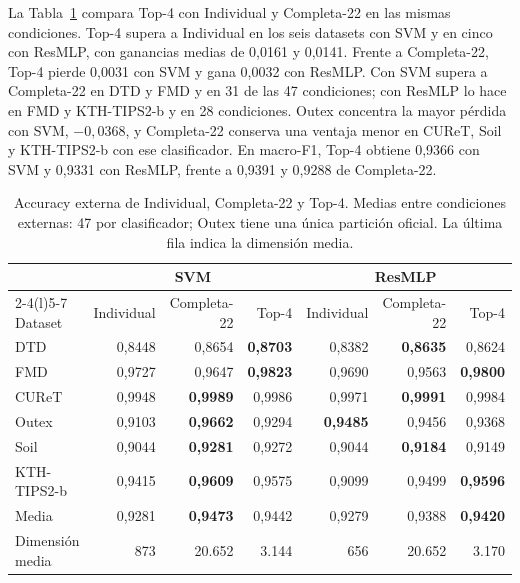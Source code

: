 \documentclass[a4paper,fleqn]{cas-sc}
\begin{document}
La Tabla~\ref{tab:top4} compara Top-4 con Individual y Completa-22 en las mismas condiciones. Top-4 supera a Individual en los seis datasets con SVM y en cinco con ResMLP, con ganancias medias de 0,0161 y 0,0141. Frente a Completa-22, Top-4 pierde 0,0031 con SVM y gana 0,0032 con ResMLP. Con SVM supera a Completa-22 en DTD y FMD y en 31 de las 47 condiciones; con ResMLP lo hace en FMD y KTH-TIPS2-b y en 28 condiciones. Outex concentra la mayor pérdida con SVM, $-0{,}0368$, y Completa-22 conserva una ventaja menor en CUReT, Soil y KTH-TIPS2-b con ese clasificador. En macro-F1, Top-4 obtiene 0,9366 con SVM y 0,9331 con ResMLP, frente a 0,9391 y 0,9288 de Completa-22.

\begin{table}[pos=htbp]
\centering
\caption{Accuracy externa de Individual, Completa-22 y Top-4. Medias entre condiciones externas: 47 por clasificador; Outex tiene una única partición oficial. La última fila indica la dimensión media.}
\label{tab:top4}
\small
\begin{tabular}{@{}lrrrrrr@{}}
\toprule
 & \multicolumn{3}{c}{SVM} & \multicolumn{3}{c}{ResMLP} \\
\cmidrule(lr){2-4}\cmidrule(l){5-7}
Dataset & Individual & Completa-22 & Top-4 & Individual & Completa-22 & Top-4 \\
\midrule
DTD & 0,8448 & 0,8654 & \textbf{0,8703} & 0,8382 & \textbf{0,8635} & 0,8624 \\
FMD & 0,9727 & 0,9647 & \textbf{0,9823} & 0,9690 & 0,9563 & \textbf{0,9800} \\
CUReT & 0,9948 & \textbf{0,9989} & 0,9986 & 0,9971 & \textbf{0,9991} & 0,9984 \\
Outex & 0,9103 & \textbf{0,9662} & 0,9294 & \textbf{0,9485} & 0,9456 & 0,9368 \\
Soil & 0,9044 & \textbf{0,9281} & 0,9272 & 0,9044 & \textbf{0,9184} & 0,9149 \\
KTH-TIPS2-b & 0,9415 & \textbf{0,9609} & 0,9575 & 0,9099 & 0,9499 & \textbf{0,9596} \\
\midrule
Media & 0,9281 & \textbf{0,9473} & 0,9442 & 0,9279 & 0,9388 & \textbf{0,9420} \\
Dimensión media & 873 & 20.652 & 3.144 & 656 & 20.652 & 3.170 \\
\bottomrule
\end{tabular}
\end{table}
\end{document}
